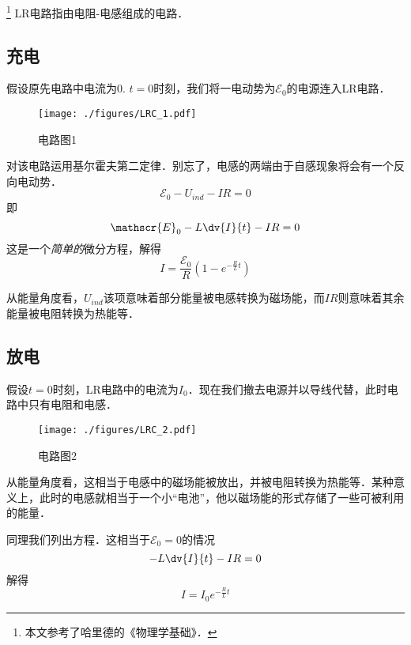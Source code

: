 
\footnote{本文参考了哈里德的《物理学基础》．}
LR电路指由电阻-电感组成的电路．

\subsection{充电}
假设原先电路中电流为$0$. $t=0$时刻，我们将一电动势为$\mathscr{E}_0$的电源连入LR电路．
\begin{figure}[ht]
\centering
\texttt{[image: ./figures/LRC\_1.pdf]}
\caption{电路图1} \label{LRC_fig1}
\end{figure}

对该电路运用基尔霍夫第二定律．别忘了，电感的两端由于自感现象将会有一个反向电动势．
$$
\mathscr{E}_0 - U_{ind} - IR = 0
$$
即
\begin{equation}
\mathscr{E}_0 - L\dv{I}{t} - IR = 0
\end{equation}
这是一个\textsl{简单的}微分方程，解得
\begin{equation}
I = \frac{\mathscr{E}_0}{R} (1-e^{-\frac{R}{L}t})
\end{equation}

从能量角度看，$U_{ind}$该项意味着部分能量被电感转换为磁场能，而$IR$则意味着其余能量被电阻转换为热能等．

\subsection{放电}
假设$t=0$时刻，LR电路中的电流为$I_0$．现在我们撤去电源并以导线代替，此时电路中只有电阻和电感．
\begin{figure}[ht]
\centering
\texttt{[image: ./figures/LRC\_2.pdf]}
\caption{电路图2} \label{LRC_fig2}
\end{figure}
从能量角度看，这相当于电感中的磁场能被放出，并被电阻转换为热能等．某种意义上，此时的电感就相当于一个小“电池”，他以磁场能的形式存储了一些可被利用的能量．

同理我们列出方程．这相当于$\mathscr{E}_0=0$的情况
\begin{equation}
- L\dv{I}{t} - IR = 0
\end{equation}
解得
\begin{equation}
I = I_0 e^{-\frac{R}{L}t}
\end{equation}
